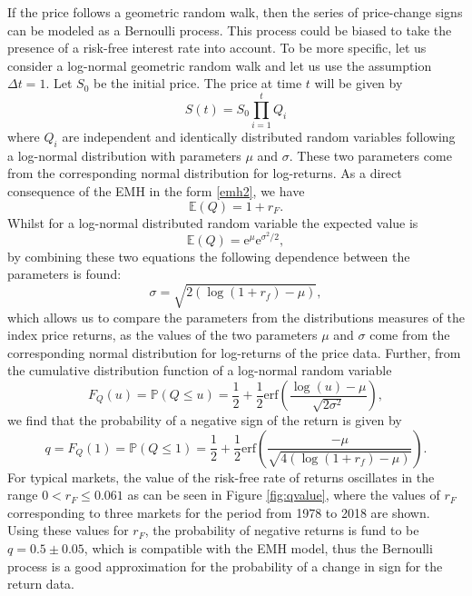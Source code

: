 \documentclass[a4paper]{jpconf}
\begin{document}
If the price follows a geometric random walk, then the series of price-change signs can be modeled as a Bernoulli process. This process could be biased to take the presence of a risk-free interest rate into account. To be more specific, let us consider a log-normal geometric random walk and let us use the assumption $\Delta t =1$. Let $S_0$ be the initial price. The price at time $t$ will be given by
\begin{equation}
S(t)=S_0 \prod_{i=1}^t Q_i
\end{equation}
where $Q_i$ are independent and identically distributed random variables following a log-normal distribution with parameters $\mu$ and $\sigma$. These two parameters come from the corresponding normal distribution for log-returns. As a direct consequence of the EMH in the form \eqref{emh2}, we have
\begin{equation}
\mathbb{E} (Q) = 1 + r_F.
\end{equation}
Whilst for a log-normal distributed random variable the expected value is
\begin{equation}
\mathbb{E}(Q) = \mathrm{e}^\mu \mathrm{e}^{\sigma^2/2},
\end{equation}
by combining these two equations the following dependence between the parameters is found:
\begin{equation}
\sigma = \sqrt{2\left(\log(1+r_f)-\mu \right)},
\end{equation}
which allows us to compare the parameters from the distributions measures of the index price returns, as the values of the two parameters  $\mu$ and $\sigma$ come from the corresponding normal distribution for log-returns of the price data. Further, from the cumulative distribution function of a log-normal random variable 
\begin{equation}
F_Q(u)=\mathbb{P}(Q \leq u) = \frac{1}{2} + \frac{1}{2} \mathrm{erf}\left(
\frac{\log(u) -\mu}{\sqrt{2 \sigma^2}} \right),
\end{equation}
we find that the probability of a negative sign of the return is given by 
\begin{equation}
q=F_Q(1)=\mathbb{P}(Q \leq 1)=\frac{1}{2} + \frac{1}{2} \mathrm{erf}\left(
\frac{- \mu}{\sqrt{4(\log(1+r_f)-\mu)}} \right).
\end{equation}
For typical markets, the value of the risk-free rate of returns oscillates in the range $0 < r_F \leq 0.061$ as can be seen in Figure \ref{fig:qvalue}, where the values of $r_F$ corresponding to three markets for the period from 1978 to 2018 are shown. Using these values for $r_F$, the probability of negative returns is fund to be $q=0.5 \pm 0.05$, which is compatible with the EMH model, thus the Bernoulli process is a good approximation for the probability of a change in sign for the return data.
\end{document}
